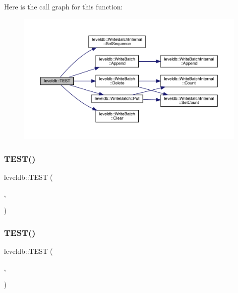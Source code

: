 Here is the call graph for this function\+:
\nopagebreak
\begin{figure}[H]
\begin{center}
\leavevmode
\includegraphics[width=350pt]{namespaceleveldb_a6b1521832d07ed987bc4ea6c3867bd00_cgraph}
\end{center}
\end{figure}
\mbox{\label{namespaceleveldb_abfb19a8fcd10a881d34dba3821434415}} 
\subsubsection{\texorpdfstring{TEST()}{TEST()}\hspace{0.1cm}{\footnotesize\ttfamily [15/102]}}
{\footnotesize\ttfamily leveldb\+::\+T\+E\+ST (\begin{DoxyParamCaption}\item[{\mbox{\hyperlink{classleveldb_1_1_format_test}{Format\+Test}}}]{,  }\item[{Internal\+Key\+Shortest\+Successor}]{ }\end{DoxyParamCaption})}

\mbox{\label{namespaceleveldb_a9c4f7d5038dfc2985100b60ae2549fde}} 
\subsubsection{\texorpdfstring{TEST()}{TEST()}\hspace{0.1cm}{\footnotesize\ttfamily [16/102]}}
{\footnotesize\ttfamily leveldb\+::\+T\+E\+ST (\begin{DoxyParamCaption}\item[{\mbox{\hyperlink{classleveldb_1_1_auto_compact_test}{Auto\+Compact\+Test}}}]{,  }\item[{Read\+All}]{ }\end{DoxyParamCaption})}

